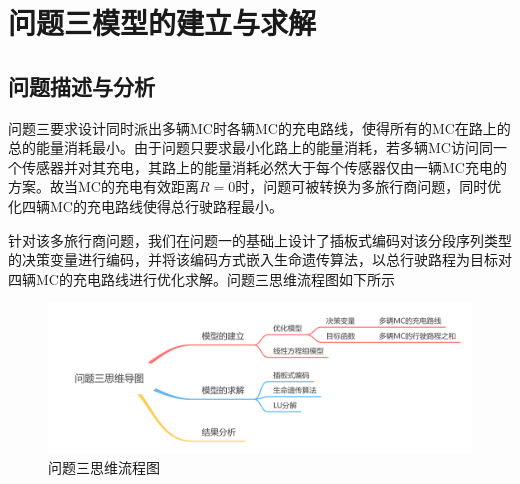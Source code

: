 \documentclass{whutmod}
\begin{document}
    \section{问题三模型的建立与求解}
    \subsection{问题描述与分析}
    问题三要求设计同时派出多辆MC时各辆MC的充电路线，使得所有的MC在路上的总的能量消耗最小。由于问题只要求最小化路上的能量消耗，若多辆MC访问同一个传感器并对其充电，其路上的能量消耗必然大于每个传感器仅由一辆MC充电的方案。故当MC的充电有效距离$R=0$时，问题可被转换为多旅行商问题，同时优化四辆MC的充电路线使得总行驶路程最小。
    
    针对该多旅行商问题，我们在问题一的基础上设计了插板式编码对该分段序列类型的决策变量进行编码，并将该编码方式嵌入生命遗传算法，以总行驶路程为目标对四辆MC的充电路线进行优化求解。问题三思维流程图如下所示
    
    \begin{figure}[H]
    	\centering
    	\includegraphics[width=\textwidth]{figures/3.png}
    	\caption{问题三思维流程图}\label{asdf}
    \end{figure}
\end{document}
